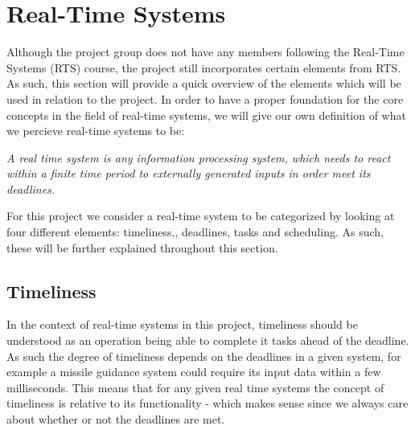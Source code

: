 \section{Real-Time Systems}
Although the project group does not have any members following the Real-Time
Systems (RTS) course, the project still incorporates certain elements from RTS.
As such, this section will provide a quick overview of the elements which will
be used in relation to the project.
In order to have a proper foundation for the core concepts in the field of
real-time systems, we will give our own definition of what we percieve real-time
systems to be:

\begin{center}
\begin{minipage}{0.8\linewidth}
\textit{A real time system is any information processing system, which needs to
react within a finite time period to externally generated inputs in order meet
its deadlines.}
\end{minipage}
\end{center}

For this project we consider a real-time system to be categorized by looking at
four different elements: timeliness,, deadlines, tasks and scheduling. As such,
these will be further explained throughout this section.

\subsection{Timeliness}

In the context of real-time systems in this project, timeliness should be
understood as an operation being able to complete it tasks ahead of the deadline. As such the
degree of timeliness depends on the deadlines in a given system, for example a
missile guidance system could require its input data within a few milliseconds.
This means that for any given real time systems the concept of timeliness is
relative to its functionality - which makes sense since we always care about
whether or not the deadlines are met.


